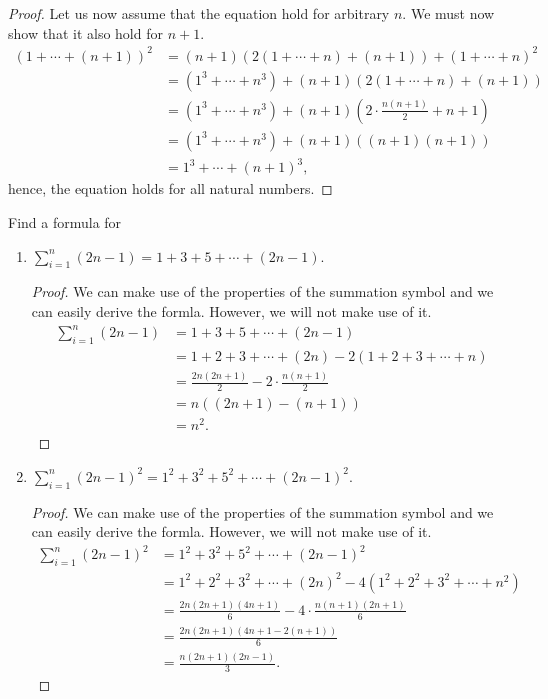 \begin{exercise}[\textbf{1}]
\begin{enumerate}
\begin{proof}
              Let us now assume that the equation hold for
              arbitrary $n$. We must now show that it also hold for $n+1$.
              \begin{align*}
                  (1+\dotsb +(n+1))^2 &= (n+1)(2(1+\dotsb +n)+(n+1)) + (1+\dotsb +n)^2 \\
                  &= (1^3+\dotsb +n^3)+(n+1)(2(1+\dotsb +n)+(n+1)) \\
                  &= (1^3+\dotsb +n^3) + (n+1)(2\cdot \frac{n(n+1)}{2}+n+1) \\
                  &= (1^3+\dotsb +n^3) + (n+1)((n+1)(n+1)) \\
                  &= 1^3+\dotsb +(n+1)^3,
              \end{align*}
              hence, the equation holds for all natural numbers.
         \end{proof}
     \end{enumerate}
\end{exercise}
\begin{exercise}[\textbf{2}] Find a formula for 
     \begin{enumerate}
        \item $\sum \limits_{i=1} ^{n} (2n-1) = 1+3+5+\dotsb +(2n-1)$.
        \begin{proof}We can make use of the properties of the summation symbol
        and we can easily derive the formla. However, we will not make use of it.
             \begin{align*}
                \sum \limits_{i=1} ^{n} (2n-1) &= 1+3+5+\dotsb +(2n-1) \\
                &= 1+2+3+\dotsb +(2n) - 2(1+2+3+\dotsb +n) \\
                &= \frac{2n(2n+1)}{2} - 2\cdot \frac{n(n+1)}{2} \\
                &= n((2n+1)-(n+1)) \\
                &=n^2.
             \end{align*}
        \end{proof}
        \item $\sum \limits_{i=1} ^{n} (2n-1)^2 = 1^2+3^2+5^2+\dotsb +(2n-1)^2$.
        \begin{proof} We can make use of the properties of the summation symbol
            and we can easily derive the formla. However, we will not make use of it.
             \begin{align*}
                \sum \limits_{i=1} ^{n} (2n-1)^2 &= 1^2+3^2+5^2+\dotsb +(2n-1)^2 \\
                &= 1^2+2^2+3^2+\dotsb +(2n)^2 - 4(1^2+2^2+3^2+\dotsb +n^2) \\
                &= \frac{2n(2n+1)(4n+1)}{6} - 4\cdot \frac{n(n+1)(2n+1)}{6} \\
                &= \frac{2n(2n+1)\left(4n+1-2(n+1)\right)}{6} \\
                &= \frac{n(2n+1)(2n-1)}{3}.
             \end{align*}
        \end{proof}
     \end{enumerate}
\end{exercise}
